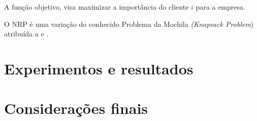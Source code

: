 \documentclass[12pt]{article}
\begin{document}
    
    A função objetivo, visa maximizar a importância do cliente $i$ para a empresa. 

    O NRP é uma variação do conhecido Problema da Mochila \textit{(Knapsack Problem}) atribuída a \cite{bagnall2001next} e \cite{salkin1975knapsack}. 




\section{Experimentos e resultados}\label{resultados}


\section{Considerações finais}\label{consideracao}




\end{document}

